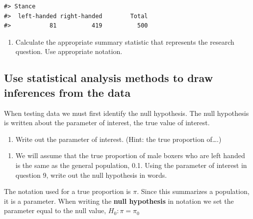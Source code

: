 \documentclass[
]{report}
\providecommand{\tightlist}{%
  \setlength{\itemsep}{0pt}\setlength{\parskip}{0pt}}
\begin{document}
\begin{verbatim}
#> Stance
#>  left-handed right-handed        Total 
#>           81          419          500
\end{verbatim}

\begin{enumerate}
\def\labelenumi{\arabic{enumi}.}
\setcounter{enumi}{7}
\tightlist
\item
  Calculate the appropriate summary statistic that represents the research question. Use appropriate notation.
\end{enumerate}

\vspace{0.5in}

\hypertarget{use-statistical-analysis-methods-to-draw-inferences-from-the-data}{%
\subsection{Use statistical analysis methods to draw inferences from the data}\label{use-statistical-analysis-methods-to-draw-inferences-from-the-data}}

When testing data we must first identify the null hypothesis. The null hypothesis is written about the parameter of interest, the true value of interest.

\begin{enumerate}
\def\labelenumi{\arabic{enumi}.}
\setcounter{enumi}{8}
\tightlist
\item
  Write out the parameter of interest. (Hint: the true proportion of\ldots.)
\end{enumerate}

\vspace{1in}

\begin{enumerate}
\def\labelenumi{\arabic{enumi}.}
\setcounter{enumi}{9}
\tightlist
\item
  We will assume that the true proportion of male boxers who are left handed is the same as the general population, 0.1. Using the parameter of interest in question 9, write out the null hypothesis in words.
\end{enumerate}

\vspace{1in}

\newpage

The notation used for a true proportion is \(\pi\). Since this summarizes a population, it is a parameter. When writing the \textbf{null hypothesis} in notation we set the parameter equal to the null value, \(H_0: \pi = \pi_0\)
\end{document}
